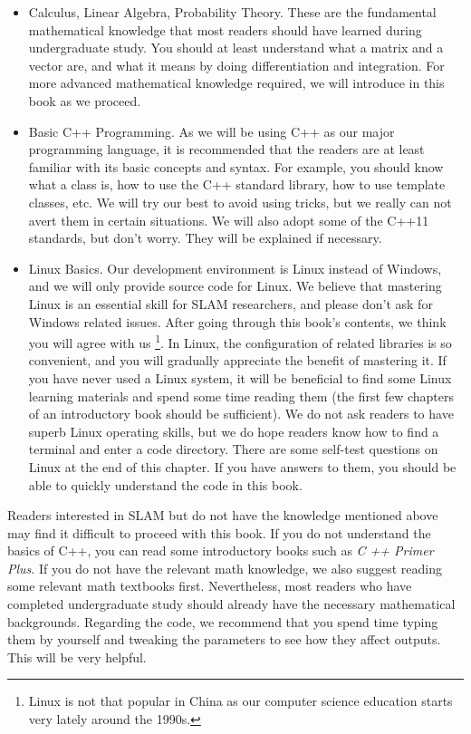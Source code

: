 \begin{itemize}
	\item Calculus, Linear Algebra, Probability Theory. These are the fundamental mathematical knowledge that most readers should have learned during undergraduate study. You should at least understand what a matrix and a vector are, and what it means by doing differentiation and integration. For more advanced mathematical knowledge required, we will introduce in this book as we proceed.
	\item Basic C++ Programming. As we will be using C++ as our major programming language, it is recommended that the readers are at least familiar with its basic concepts and syntax. For example, you should know what a class is, how to use the C++ standard library, how to use template classes, etc. We will try our best to avoid using tricks, but we really can not avert them in certain situations. We will also adopt some of the C++11 standards, but don't worry. They will be explained if necessary.
	
	\item Linux Basics. Our development environment is Linux instead of Windows, and we will only provide source code for Linux. We believe that mastering Linux is an essential skill for SLAM researchers, and please  don't ask for Windows related issues. After going through this book's contents, we think you will agree with us \footnote{Linux is not that popular in China as our computer science education starts very lately around the 1990s.}. In Linux, the configuration of related libraries is so convenient, and you will gradually appreciate the benefit of mastering it. If you have never used a Linux system, it will be beneficial to find some Linux learning materials and spend some time reading them (the first few chapters of an introductory book should be sufficient). We do not ask readers to have superb Linux operating skills, but we do hope readers know how to find a terminal and enter a code directory. There are some self-test questions on Linux at the end of this chapter. If you have answers to them, you should be able to quickly understand the code in this book.
\end{itemize}


Readers interested in SLAM but do not have the knowledge mentioned above may find it difficult to proceed with this book. If you do not understand the basics of C++, you can read some introductory books such as \textit{C ++ Primer Plus}. If you do not have the relevant math knowledge, we also suggest reading some relevant math textbooks first. Nevertheless, most readers who have completed undergraduate study should already have the necessary mathematical backgrounds. Regarding the code, we recommend that you spend time typing them by yourself and tweaking the parameters to see how they affect outputs. This will be very helpful.

